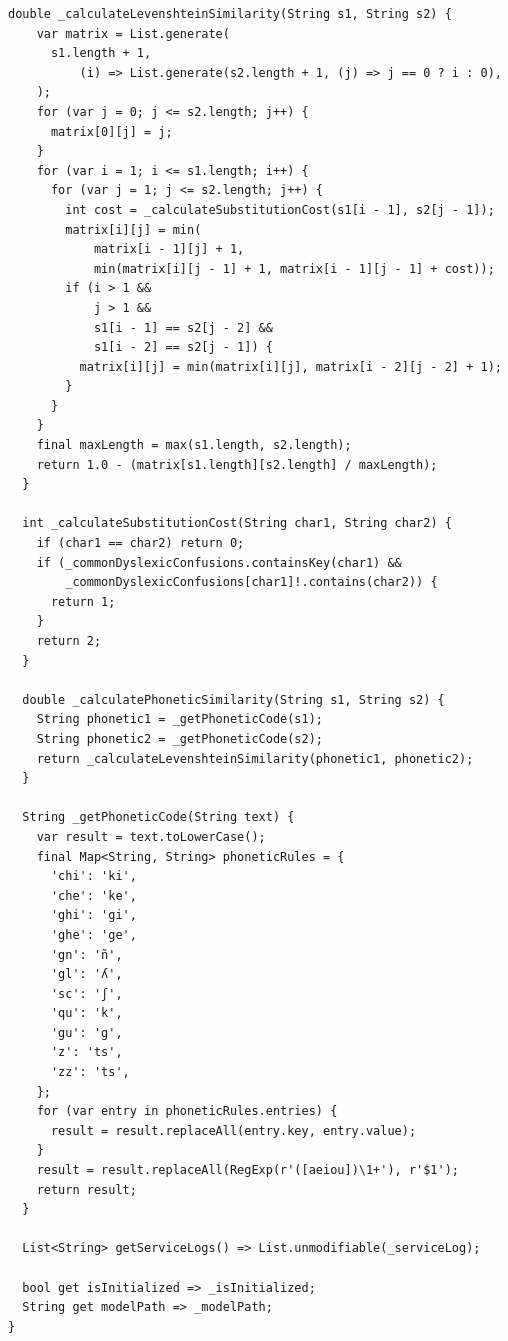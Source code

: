 \documentclass[14pt]{extbook}
\begin{document}
\begin{lstlisting}[caption=vosk\_service.dart, label=lst:VoskService]
  double _calculateLevenshteinSimilarity(String s1, String s2) {
    var matrix = List.generate(
      s1.length + 1,
          (i) => List.generate(s2.length + 1, (j) => j == 0 ? i : 0),
    );
    for (var j = 0; j <= s2.length; j++) {
      matrix[0][j] = j;
    }
    for (var i = 1; i <= s1.length; i++) {
      for (var j = 1; j <= s2.length; j++) {
        int cost = _calculateSubstitutionCost(s1[i - 1], s2[j - 1]);
        matrix[i][j] = min(
            matrix[i - 1][j] + 1,
            min(matrix[i][j - 1] + 1, matrix[i - 1][j - 1] + cost));
        if (i > 1 &&
            j > 1 &&
            s1[i - 1] == s2[j - 2] &&
            s1[i - 2] == s2[j - 1]) {
          matrix[i][j] = min(matrix[i][j], matrix[i - 2][j - 2] + 1);
        }
      }
    }
    final maxLength = max(s1.length, s2.length);
    return 1.0 - (matrix[s1.length][s2.length] / maxLength);
  }

  int _calculateSubstitutionCost(String char1, String char2) {
    if (char1 == char2) return 0;
    if (_commonDyslexicConfusions.containsKey(char1) &&
        _commonDyslexicConfusions[char1]!.contains(char2)) {
      return 1;
    }
    return 2;
  }

  double _calculatePhoneticSimilarity(String s1, String s2) {
    String phonetic1 = _getPhoneticCode(s1);
    String phonetic2 = _getPhoneticCode(s2);
    return _calculateLevenshteinSimilarity(phonetic1, phonetic2);
  }

  String _getPhoneticCode(String text) {
    var result = text.toLowerCase();
    final Map<String, String> phoneticRules = {
      'chi': 'ki',
      'che': 'ke',
      'ghi': 'gi',
      'ghe': 'ge',
      'gn': 'ñ',
      'gl': 'ʎ',
      'sc': 'ʃ',
      'qu': 'k',
      'gu': 'g',
      'z': 'ts',
      'zz': 'ts',
    };
    for (var entry in phoneticRules.entries) {
      result = result.replaceAll(entry.key, entry.value);
    }
    result = result.replaceAll(RegExp(r'([aeiou])\1+'), r'$1');
    return result;
  }

  List<String> getServiceLogs() => List.unmodifiable(_serviceLog);

  bool get isInitialized => _isInitialized;
  String get modelPath => _modelPath;
}
\end{lstlisting}
\end{document}

